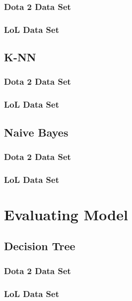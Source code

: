 \documentclass[sigconf]{acmart}
\begin{document}
\subsubsection{Dota 2 Data Set }

\subsubsection{LoL Data Set}

\subsection{K-NN}

\subsubsection{Dota 2 Data Set }

\subsubsection{LoL Data Set}

\subsection{Naive Bayes}

\subsubsection{Dota 2 Data Set }

\subsubsection{LoL Data Set}

\section{Evaluating Model}

\subsection{Decision Tree}

\subsubsection{Dota 2 Data Set }

\subsubsection{LoL Data Set}
\end{document}
